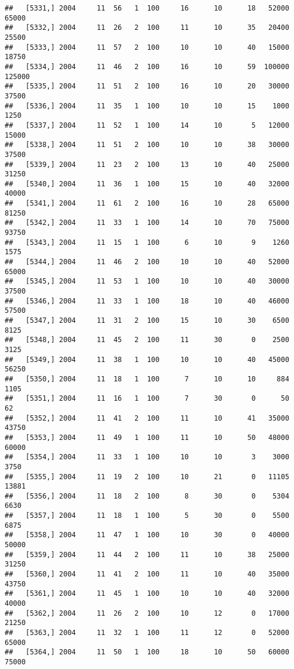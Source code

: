 \documentclass{article}\usepackage[]{graphicx}\usepackage[]{color}
\makeatletter
\newenvironment{kframe}{%
 \def\at@end@of@kframe{}%
 \ifinner\ifhmode%
  \def\at@end@of@kframe{\end{minipage}}%
  \begin{minipage}{\columnwidth}%
 \fi\fi%
 \def\FrameCommand##1{\hskip\@totalleftmargin \hskip-\fboxsep
 \colorbox{shadecolor}{##1}\hskip-\fboxsep
     \hskip-\linewidth \hskip-\@totalleftmargin \hskip\columnwidth}%
 \MakeFramed {\advance\hsize-\width
   \@totalleftmargin\z@ \linewidth\hsize
   \@setminipage}}%
 {\par\unskip\endMakeFramed%
 \at@end@of@kframe}
\newenvironment{knitrout}{}{} %
\makeatother
\begin{document}
\begin{knitrout}
\begin{kframe}
\begin{verbatim}
##   [5331,] 2004     11  56   1  100     16      10      18   52000   65000
##   [5332,] 2004     11  26   2  100     11      10      35   20400   25500
##   [5333,] 2004     11  57   2  100     10      10      40   15000   18750
##   [5334,] 2004     11  46   2  100     16      10      59  100000  125000
##   [5335,] 2004     11  51   2  100     16      10      20   30000   37500
##   [5336,] 2004     11  35   1  100     10      10      15    1000    1250
##   [5337,] 2004     11  52   1  100     14      10       5   12000   15000
##   [5338,] 2004     11  51   2  100     10      10      38   30000   37500
##   [5339,] 2004     11  23   2  100     13      10      40   25000   31250
##   [5340,] 2004     11  36   1  100     15      10      40   32000   40000
##   [5341,] 2004     11  61   2  100     16      10      28   65000   81250
##   [5342,] 2004     11  33   1  100     14      10      70   75000   93750
##   [5343,] 2004     11  15   1  100      6      10       9    1260    1575
##   [5344,] 2004     11  46   2  100     10      10      40   52000   65000
##   [5345,] 2004     11  53   1  100     10      10      40   30000   37500
##   [5346,] 2004     11  33   1  100     18      10      40   46000   57500
##   [5347,] 2004     11  31   2  100     15      10      30    6500    8125
##   [5348,] 2004     11  45   2  100     11      30       0    2500    3125
##   [5349,] 2004     11  38   1  100     10      10      40   45000   56250
##   [5350,] 2004     11  18   1  100      7      10      10     884    1105
##   [5351,] 2004     11  16   1  100      7      30       0      50      62
##   [5352,] 2004     11  41   2  100     11      10      41   35000   43750
##   [5353,] 2004     11  49   1  100     11      10      50   48000   60000
##   [5354,] 2004     11  33   1  100     10      10       3    3000    3750
##   [5355,] 2004     11  19   2  100     10      21       0   11105   13881
##   [5356,] 2004     11  18   2  100      8      30       0    5304    6630
##   [5357,] 2004     11  18   1  100      5      30       0    5500    6875
##   [5358,] 2004     11  47   1  100     10      30       0   40000   50000
##   [5359,] 2004     11  44   2  100     11      10      38   25000   31250
##   [5360,] 2004     11  41   2  100     11      10      40   35000   43750
##   [5361,] 2004     11  45   1  100     10      10      40   32000   40000
##   [5362,] 2004     11  26   2  100     10      12       0   17000   21250
##   [5363,] 2004     11  32   1  100     11      12       0   52000   65000
##   [5364,] 2004     11  50   1  100     18      10      50   60000   75000

\end{verbatim}
\end{kframe}
\end{knitrout}
\end{document}
